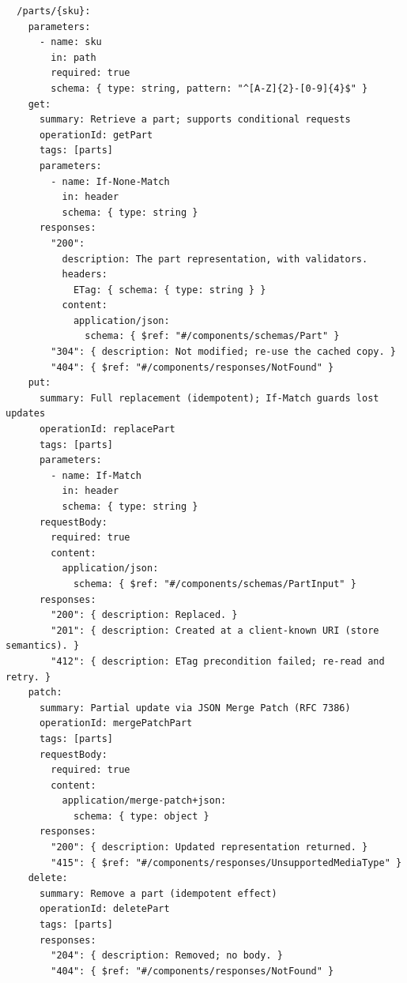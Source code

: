 \begin{verbatim}
  /parts/{sku}:
    parameters:
      - name: sku
        in: path
        required: true
        schema: { type: string, pattern: "^[A-Z]{2}-[0-9]{4}$" }
    get:
      summary: Retrieve a part; supports conditional requests
      operationId: getPart
      tags: [parts]
      parameters:
        - name: If-None-Match
          in: header
          schema: { type: string }
      responses:
        "200":
          description: The part representation, with validators.
          headers:
            ETag: { schema: { type: string } }
          content:
            application/json:
              schema: { $ref: "#/components/schemas/Part" }
        "304": { description: Not modified; re-use the cached copy. }
        "404": { $ref: "#/components/responses/NotFound" }
    put:
      summary: Full replacement (idempotent); If-Match guards lost updates
      operationId: replacePart
      tags: [parts]
      parameters:
        - name: If-Match
          in: header
          schema: { type: string }
      requestBody:
        required: true
        content:
          application/json:
            schema: { $ref: "#/components/schemas/PartInput" }
      responses:
        "200": { description: Replaced. }
        "201": { description: Created at a client-known URI (store semantics). }
        "412": { description: ETag precondition failed; re-read and retry. }
    patch:
      summary: Partial update via JSON Merge Patch (RFC 7386)
      operationId: mergePatchPart
      tags: [parts]
      requestBody:
        required: true
        content:
          application/merge-patch+json:
            schema: { type: object }
      responses:
        "200": { description: Updated representation returned. }
        "415": { $ref: "#/components/responses/UnsupportedMediaType" }
    delete:
      summary: Remove a part (idempotent effect)
      operationId: deletePart
      tags: [parts]
      responses:
        "204": { description: Removed; no body. }
        "404": { $ref: "#/components/responses/NotFound" }


\end{verbatim}
